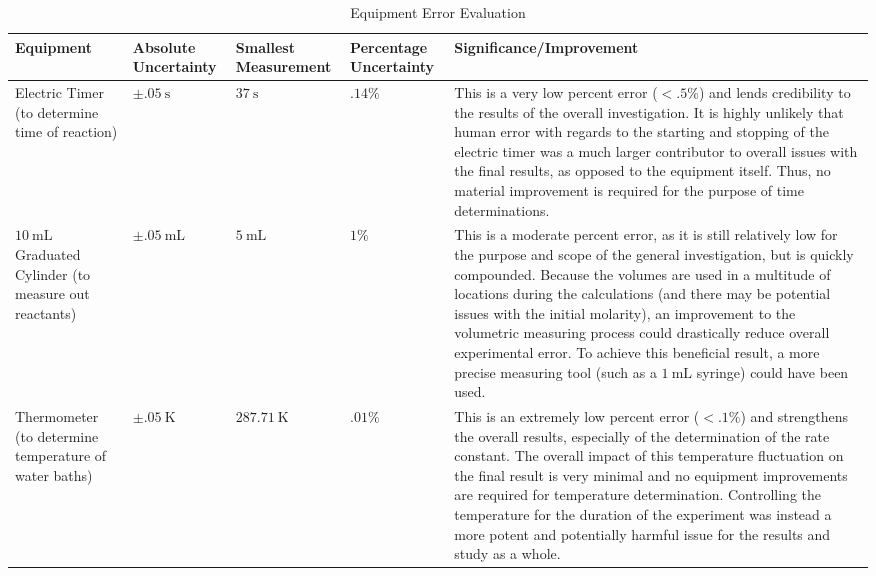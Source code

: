 \begin{table}[h!]
\centering

\begin{tabular}{|p{2.3cm}|p{1.5cm}|p{1.7cm}|p{1.5cm}|p{9.5cm}|}
\hline 
 Equipment & Absolute \newline Uncertainty & Smallest \newline Measurement & Percentage \newline Uncertainty & Significance/Improvement\\
 \hline
 Electric Timer (to determine time of reaction) & $\pm \SI{.05}{\second}$ & $\SI{37}{\second}$ & $.14\%$ & This is a very low percent error ($< .5\%$) and lends credibility to the results of the overall investigation. It is highly unlikely that human error with regards to the starting and stopping of the electric timer was a much larger contributor to overall issues with the final results, as opposed to the equipment itself. Thus, no material improvement is required for the purpose of time determinations. \\
 \hline
 $\SI{10}{\milli\liter}$ Graduated Cylinder (to measure out reactants) & $\pm \SI{.05}{\milli\liter}$ & $\SI{5}{\milli\liter}$ & $1\%$ & This is a moderate percent error, as it is still relatively low for the purpose and scope of the general investigation, but is quickly compounded. Because the volumes are used in a multitude of locations during the calculations (and there may be potential issues with the initial molarity), an improvement to the volumetric measuring process could drastically reduce overall experimental error. To achieve this beneficial result, a more precise measuring tool (such as a $\SI{1}{\milli\liter}$ syringe) could have been used.\\
 \hline
 Thermometer (to determine temperature of water baths) & $\pm \SI{.05}{\kelvin}$ & $\SI{287.71}{\kelvin}$ & $.01\%$ & This is an extremely low percent error ($< .1\%$) and strengthens the overall results, especially of the determination of the rate constant. The overall impact of this temperature fluctuation on the final result is very minimal and no equipment improvements are required for temperature determination. Controlling the temperature for the duration of the experiment was instead a more potent and potentially harmful issue for the results and study as a whole.\\
\hline
\end{tabular}
\caption{Equipment Error Evaluation}
\label{table:equipment_error_evaluation}
\end{table}

